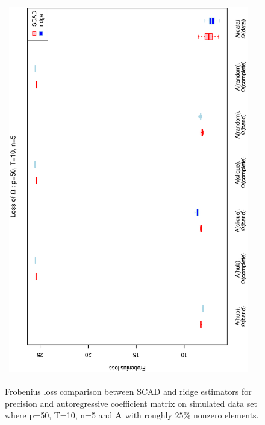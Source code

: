\begin{figure}[h!]
\begin{tabular}{cc}
\includegraphics[scale=0.45,angle=270]{LossOmega50T10N5_25.eps}
\end{tabular}
\caption{Frobenius loss comparison between SCAD and ridge estimators for precision and autoregressive coefficient matrix on simulated data set where p=50, T=10, n=5 and $\mathbf{A}$ with roughly $25\%$ nonzero elements.}
\label{figSM:Loss50T10N5_25}
\end{figure}


